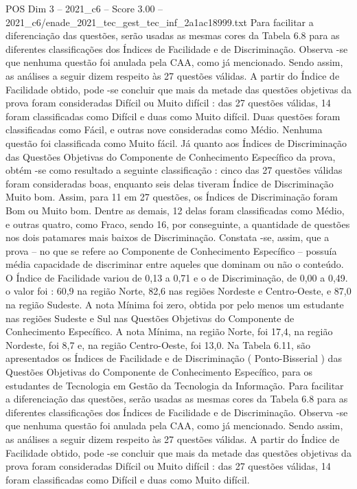 \begin{textsample}{POS Dim 3 – 2021\_c6 – Score 3.00 – 2021\_c6/enade\_2021\_tec\_gest\_tec\_inf\_2a1ac18999.txt}
Para facilitar a diferenciação das questões, serão usadas as mesmas cores da Tabela 6.8 para as diferentes classificações dos Índices de Facilidade e de Discriminação.
Observa -se que nenhuma questão foi anulada pela CAA, como já mencionado.
Sendo assim, as análises a seguir dizem respeito às 27 questões válidas.
A partir do Índice de Facilidade obtido, pode -se concluir que mais da metade das questões objetivas da prova foram consideradas Difícil ou Muito difícil : das 27 questões válidas, 14 foram classificadas como Difícil e duas como Muito difícil.
Duas questões foram classificadas como Fácil, e outras nove consideradas como Médio.
Nenhuma questão foi classificada como Muito fácil.
Já quanto aos Índices de Discriminação das Questões Objetivas do Componente de Conhecimento Específico da prova, obtém -se como resultado a seguinte classificação : cinco das 27 questões válidas foram consideradas boas, enquanto seis delas tiveram Índice de Discriminação Muito bom.
Assim, para 11 em 27 questões, os Índices de Discriminação foram Bom ou Muito bom.
Dentre as demais, 12 delas foram classificadas como Médio, e outras quatro, como Fraco, sendo 16, por conseguinte, a quantidade de questões nos dois patamares mais baixos de Discriminação.
Constata -se, assim, que a prova – no que se refere ao Componente de Conhecimento Específico – possuía média capacidade de discriminar entre aqueles que dominam ou não o conteúdo.
O Índice de Facilidade variou de 0,13 a 0,71 e o de Discriminação, de 0,00 a 0,49. o valor foi : 60,9 na região Norte, 82,6 nas regiões Nordeste e Centro-Oeste, e 87,0 na região Sudeste.
A nota Mínima foi zero, obtida por pelo menos um estudante nas regiões Sudeste e Sul nas Questões Objetivas do Componente de Conhecimento Específico.
A nota Mínima, na região Norte, foi 17,4, na região Nordeste, foi 8,7 e, na região Centro-Oeste, foi 13,0.
Na Tabela 6.11, são apresentados os Índices de Facilidade e de Discriminação ( Ponto-Bisserial ) das Questões Objetivas do Componente de Conhecimento Específico, para os estudantes de Tecnologia em Gestão da Tecnologia da Informação.
Para facilitar a diferenciação das questões, serão usadas as mesmas cores da Tabela 6.8 para as diferentes classificações dos Índices de Facilidade e de Discriminação.
Observa -se que nenhuma questão foi anulada pela CAA, como já mencionado.
Sendo assim, as análises a seguir dizem respeito às 27 questões válidas.
A partir do Índice de Facilidade obtido, pode -se concluir que mais da metade das questões objetivas da prova foram consideradas Difícil ou Muito difícil : das 27 questões válidas, 14 foram classificadas como Difícil e duas como Muito difícil.

\end{textsample}
